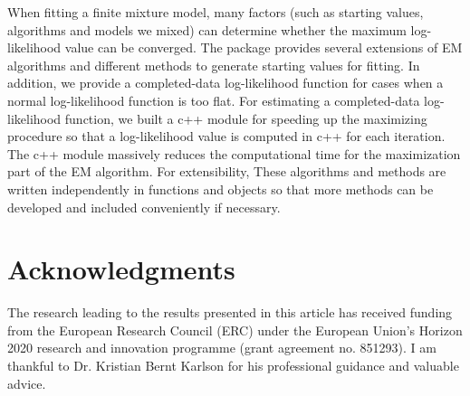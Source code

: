 \documentclass[nojss]{jss}
\begin{document}
   When fitting a finite mixture model, many factors (such as starting values, algorithms and models we mixed) can determine whether the maximum log-likelihood value can be converged. The  package provides several extensions of EM algorithms and different methods to generate starting values for fitting. In addition, we provide a completed-data log-likelihood function for cases when a normal log-likelihood function is too flat. For estimating a completed-data log-likelihood function, we built a c++ module for speeding up the maximizing procedure so that a log-likelihood value is computed in c++ for each iteration. The c++ module massively reduces the computational time for the maximization part of the EM algorithm. For extensibility, These algorithms and methods are written independently in functions and objects so that more methods can be developed and included conveniently if necessary. 
   
   \section*{Acknowledgments}
   The research leading to the results presented in this article has received funding from the European Research Council (ERC) under the European Union’s Horizon 2020 research and innovation programme (grant agreement no. 851293). I am thankful to Dr. Kristian Bernt Karlson for his professional guidance and valuable advice. 
   
\end{document}
